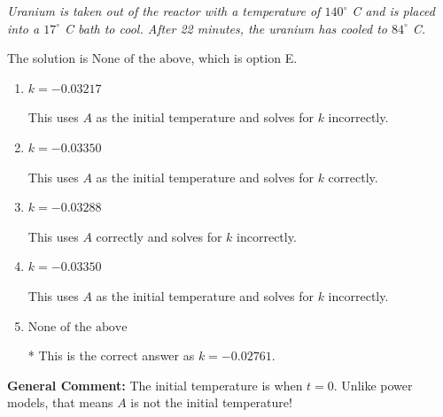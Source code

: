 \documentclass{extbook}[14pt]
\begin{document}
\begin{enumerate}
{\begin{center}
    \textit{ Uranium is taken out of the reactor with a temperature of $140^{\circ}$ C and is placed into a $17^{\circ}$ C bath to cool. After 22 minutes, the uranium has cooled to $84^{\circ}$ C. }
\end{center}
The solution is \( \text{None of the above} \), which is option E.\begin{enumerate}[label=\Alph*.]
\item \( k = -0.03217 \)

This uses $A$ as the initial temperature and solves for $k$ incorrectly.
\item \( k = -0.03350 \)

This uses $A$ as the initial temperature and solves for $k$ correctly.
\item \( k = -0.03288 \)

This uses $A$ correctly and solves for $k$ incorrectly.
\item \( k = -0.03350 \)

This uses $A$ as the initial temperature and solves for $k$ incorrectly.
\item \( \text{None of the above} \)

* This is the correct answer as $k = -0.02761$.
\end{enumerate}

\textbf{General Comment:} The initial temperature is when $t = 0$. Unlike power models, that means $A$ is not the initial temperature!
}
\end{enumerate}
\end{document}
